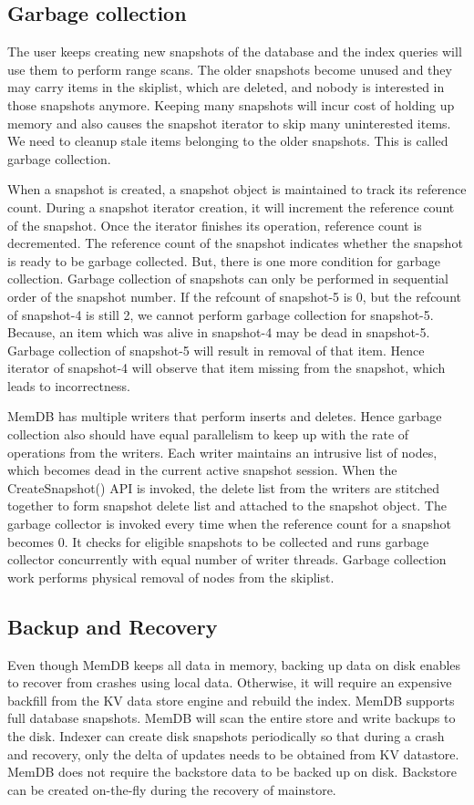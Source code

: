 \documentclass{vldb}
\begin{document}
\subsection{Garbage collection}
The user keeps creating new snapshots of the database and the index queries will use them to perform range scans. The older snapshots become unused and they may carry items in the skiplist, which are deleted, and nobody is interested in those snapshots anymore. Keeping many snapshots will incur cost of holding up memory and also causes the snapshot iterator to skip many uninterested items. We need to cleanup stale items belonging to the older snapshots. This is called garbage collection.

    When a snapshot is created, a snapshot object is maintained to track its reference count. During a snapshot iterator creation, it will increment the reference count of the snapshot. Once the iterator finishes its operation, reference count is decremented. The reference count of the snapshot indicates whether the snapshot is ready to be garbage collected. But, there is one more condition for garbage collection. Garbage collection of snapshots can only be performed in sequential order of the snapshot number. If the refcount of snapshot-5 is 0, but the refcount of snapshot-4 is still 2, we cannot perform garbage collection for snapshot-5. Because, an item which was alive in snapshot-4 may be dead in snapshot-5. Garbage collection of snapshot-5 will result in removal of that item. Hence iterator of snapshot-4 will observe that item missing from the snapshot, which leads to incorrectness.
    
        MemDB has multiple writers that perform inserts and deletes. Hence garbage collection also should have equal parallelism to keep up with the rate of operations from the writers. Each writer maintains an intrusive list of nodes, which becomes dead in the current active snapshot session. When the CreateSnapshot() API is invoked, the delete list from the writers are stitched together to form snapshot delete list and attached to the snapshot object.
            The garbage collector is invoked every time when the reference count for a snapshot becomes 0. It checks for eligible snapshots to be collected and runs garbage collector concurrently with equal number of writer threads. Garbage collection work performs physical removal of nodes from the skiplist.
            
\subsection{Backup and Recovery}
Even though MemDB keeps all data in memory, backing up data on disk enables to recover from crashes using local data. Otherwise, it will require an expensive backfill from the KV data store engine and rebuild the index. MemDB supports full database snapshots. MemDB will scan the entire store and write backups to the disk. Indexer can create disk snapshots periodically so that during a crash and recovery, only the delta of updates needs to be obtained from KV datastore. MemDB does not require the backstore data to be backed up on disk. Backstore can be created on-the-fly during the recovery of mainstore.
\end{document}
